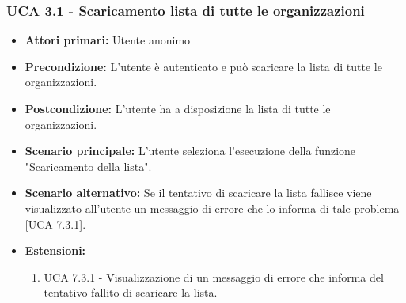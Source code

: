 \subsubsection{UCA 3.1 - Scaricamento lista di tutte le organizzazioni}%
\begin{itemize}
\item \textbf{Attori primari:} Utente anonimo
\item \textbf{Precondizione:} L'utente è autenticato e può scaricare la lista di tutte le organizzazioni.
\item \textbf{Postcondizione:} L'utente ha a disposizione la lista di tutte le organizzazioni.
\item \textbf{Scenario principale:} L'utente seleziona l'esecuzione della funzione "Scaricamento della lista".
\item \textbf{Scenario alternativo:} Se il tentativo di scaricare la lista fallisce viene visualizzato all'utente un messaggio di errore che lo informa di tale problema [UCA 7.3.1].
\item \textbf{Estensioni:}
	\begin{enumerate}
	\item UCA 7.3.1 - Visualizzazione di un messaggio di errore che informa del tentativo fallito di scaricare la lista.
\end{enumerate}
  
\end{itemize}



